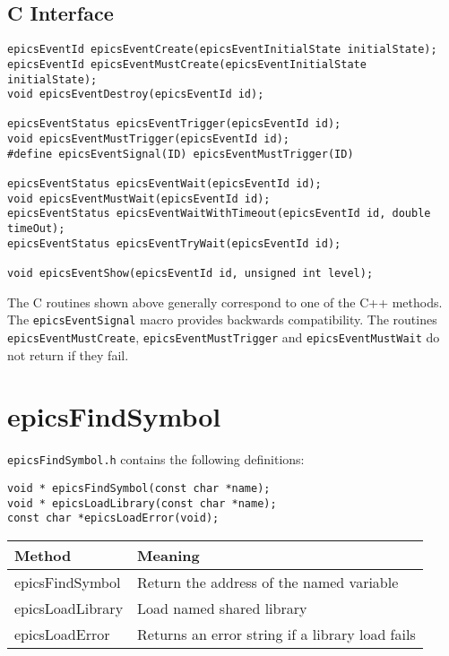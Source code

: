 \subsection{C Interface}

\begin{verbatim}
epicsEventId epicsEventCreate(epicsEventInitialState initialState);
epicsEventId epicsEventMustCreate(epicsEventInitialState initialState);
void epicsEventDestroy(epicsEventId id);

epicsEventStatus epicsEventTrigger(epicsEventId id);
void epicsEventMustTrigger(epicsEventId id);
#define epicsEventSignal(ID) epicsEventMustTrigger(ID)

epicsEventStatus epicsEventWait(epicsEventId id);
void epicsEventMustWait(epicsEventId id);
epicsEventStatus epicsEventWaitWithTimeout(epicsEventId id, double timeOut);
epicsEventStatus epicsEventTryWait(epicsEventId id);

void epicsEventShow(epicsEventId id, unsigned int level);
\end{verbatim}

The C routines shown above generally correspond to one of the C++ methods.
The \verb|epicsEventSignal| macro provides backwards compatibility.
The routines \verb|epicsEventMustCreate|, \verb|epicsEventMustTrigger| and \verb|epicsEventMustWait| do not return if they fail.

\section{epicsFindSymbol}

\verb|epicsFindSymbol.h| contains the following definitions:

\begin{verbatim}
void * epicsFindSymbol(const char *name);
void * epicsLoadLibrary(const char *name);
const char *epicsLoadError(void);
\end{verbatim}

\begin{center}
\begin{longtable}{p{1.38889in}p{2.5in}}
\textbf{Method} & \textbf{Meaning}\\
\hline
epicsFindSymbol & Return the address of the named variable\\
epicsLoadLibrary & Load named shared library\\
epicsLoadError & Returns an error string if a library load fails
\end{longtable}
\end{center}

